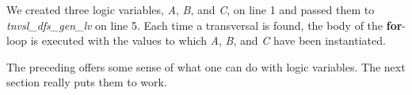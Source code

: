 We created three logic variables,  \textit{A}, \textit{B}, and \textit{C}, on line 1 and passed them to \textit{tnvsl\_dfs\_gen\_lv} on line 5. Each time a transversal is found, the body of the \textbf{for}-loop is executed with the values to which \textit{A}, \textit{B}, and \textit{C} have been instantiated. 

The preceding offers some sense of what one can do with logic variables. The next section really puts them to work.
